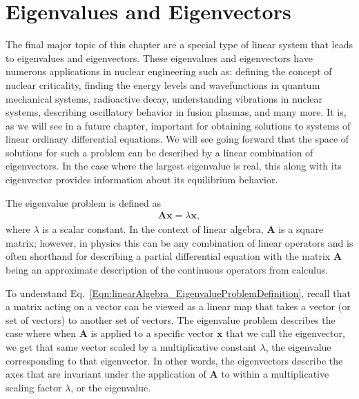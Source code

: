 \section{Eigenvalues and Eigenvectors} \label{Sec:linearAlgebra_EigenvaluesAndEigenvectors}

The final major topic of this chapter are a special type of linear system that leads to eigenvalues and eigenvectors. These eigenvalues and eigenvectors have numerous applications in nuclear engineering such as: defining the concept of nuclear criticality, finding the energy levels and wavefunctions in quantum mechanical systems, radioactive decay, understanding vibrations in nuclear systems, describing oscillatory behavior in fusion plasmas, and many more. It is, as we will see in a future chapter, important for obtaining solutions to systems of linear ordinary differential equations. We will see going forward that the space of solutions for such a problem can be described by a linear combination of eigenvectors. In the case where the largest eigenvalue is real, this along with its eigenvector provides information about its equilibrium behavior. 

The eigenvalue problem is defined as
\begin{align} \label{Eqn:linearAlgebra_EigenvalueProblemDefinition}
  \mathbf{Ax} = \lambda \mathbf{x},
\end{align}
where $\lambda$ is a scalar constant. In the context of linear algebra, $\mathbf{A}$ is a square matrix; however, in physics this can be any combination of linear operators and is often shorthand for describing a partial differential equation with the matrix $\mathbf{A}$ being an approximate description of the continuous operators from calculus.

To understand Eq.~\eqref{Eqn:linearAlgebra_EigenvalueProblemDefinition}, recall that a matrix acting on a vector can be viewed as a linear map that takes a vector (or set of vectors) to another set of vectors. The eigenvalue problem describes the case where when $\mathbf{A}$ is applied to a specific vector $\mathbf{x}$ that we call the eigenvector, we get that same vector scaled by a multiplicative constant $\lambda$, the eigenvalue corresponding to that eigenvector. In other words, the eigenvectors describe the axes that are invariant under the application of $\mathbf{A}$ to within a multiplicative scaling factor $\lambda$, or the eigenvalue.

